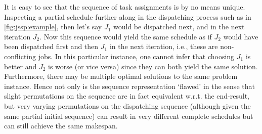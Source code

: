 \documentclass[smallextended]{svjour3}
\begin{document}
	
	
	It is easy to see that the sequence of task assignments is by no means unique. 
	Inspecting a partial schedule further along in the dispatching process such as 
	in \cref{fig:jssp:example}, then let's say $J_1$ would be dispatched next, and 
	in the next iteration $J_2$. Now this sequence would yield the same schedule as 
	if $J_2$ would have been dispatched first and then $J_1$ in the next iteration, 
	i.e., these are non-conflicting jobs.  In this particular instance, one cannot 
	infer that choosing $J_1$ is better and $J_2$ is worse (or vice versa) since
	they can both yield the same solution. Furthermore, 
	there may be multiple optimal solutions to the same 
	problem instance. Hence not only is the sequence representation `flawed' in the 
	sense that slight permutations on the sequence are in fact equivalent w.r.t. 
	the end-result, but very varying permutations on the dispatching sequence 
	(although given the same partial initial sequence) can result in very different 
	complete schedules but can still achieve the same makespan. 
	
\end{document}

